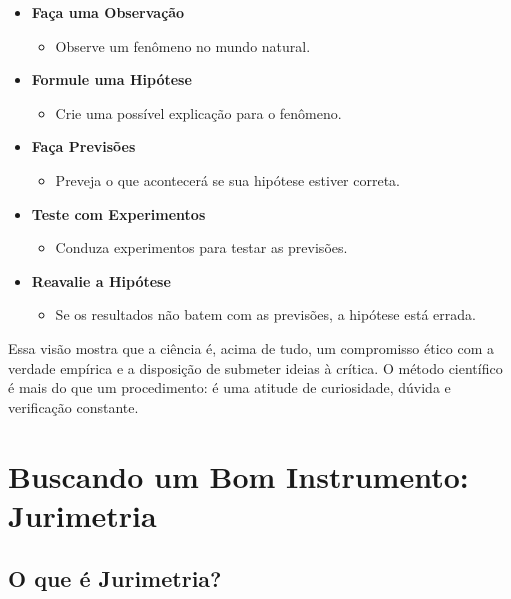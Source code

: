 \documentclass[
  letterpaper,
  DIV=11,
  numbers=noendperiod]{scrreprt}
\providecommand{\tightlist}{%
  \setlength{\itemsep}{0pt}\setlength{\parskip}{0pt}}
\begin{document}
\begin{itemize}
\tightlist
\item
  \textbf{Faça uma Observação}

  \begin{itemize}
  \tightlist
  \item
    Observe um fenômeno no mundo natural.
  \end{itemize}
\item
  \textbf{Formule uma Hipótese}

  \begin{itemize}
  \tightlist
  \item
    Crie uma possível explicação para o fenômeno.
  \end{itemize}
\item
  \textbf{Faça Previsões}

  \begin{itemize}
  \tightlist
  \item
    Preveja o que acontecerá se sua hipótese estiver correta.
  \end{itemize}
\item
  \textbf{Teste com Experimentos}

  \begin{itemize}
  \tightlist
  \item
    Conduza experimentos para testar as previsões.
  \end{itemize}
\item
  \textbf{Reavalie a Hipótese}

  \begin{itemize}
  \tightlist
  \item
    Se os resultados não batem com as previsões, a hipótese está errada.
  \end{itemize}
\end{itemize}

Essa visão mostra que a ciência é, acima de tudo, um compromisso ético
com a verdade empírica e a disposição de submeter ideias à crítica. O
método científico é mais do que um procedimento: é uma atitude de
curiosidade, dúvida e verificação constante.

\section{Buscando um Bom Instrumento:
Jurimetria}\label{buscando-um-bom-instrumento-jurimetria}

\subsection{O que é Jurimetria?}\label{o-que-uxe9-jurimetria}
\end{document}
